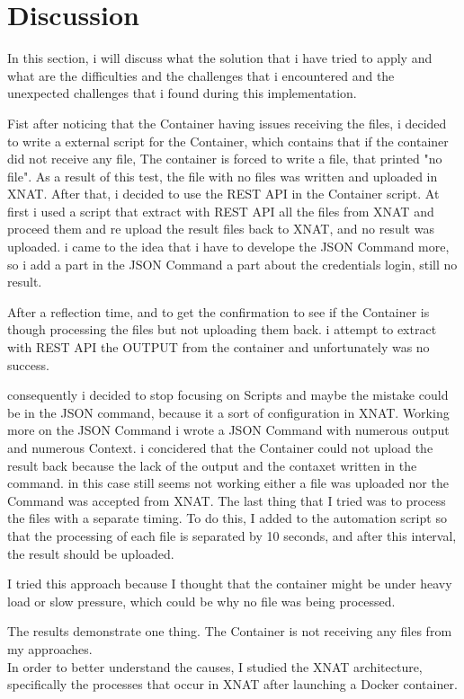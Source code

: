 \chapter{Discussion}

In this section, i will discuss what the solution that i have tried to apply and what are the difficulties and the challenges that i encountered and the unexpected challenges that i found during this implementation.

Fist after noticing that the Container having issues receiving the files, i decided to write a external script for the Container, which contains that if the container did not receive any file, The container is forced to write a file, that printed "no file". As a result of this test, the file with no files was written and uploaded in XNAT. 
After that, i decided to use the REST API in the Container script. At first i used a script that extract with REST API all the files from XNAT and proceed them and re upload the result files back to XNAT, and no result was uploaded.
i came to the idea that i have to develope the JSON Command more, so i add a part in the JSON Command a part about the credentials login, still no result.

After a reflection time, and to get the confirmation to see if the Container is though processing the files but not uploading them back. i attempt to extract with REST API the OUTPUT from the container and unfortunately was no success.

consequently i decided to stop focusing on Scripts and maybe the mistake could be in the JSON command, because it a sort of configuration in XNAT. 
Working more on the JSON Command i wrote a JSON Command with numerous output and numerous Context. i concidered that the Container could not upload the result back because the lack of the output and the contaxet written in the command.
in this case still seems not working either a file was uploaded nor the Command was accepted from XNAT.
The last thing that I tried was to process the files with a separate timing. To do this, I added to the automation script so that the processing of each file is separated by 10 seconds, and after this interval, the result should be uploaded.

I tried this approach because I thought that the container might be under heavy load or slow pressure, which could be why no file was being processed.

The results demonstrate one thing. The Container is not receiving any files from my approaches. \\
In order to better understand the causes, I studied the XNAT architecture, specifically the processes that occur in XNAT after launching a Docker container.


